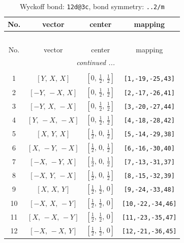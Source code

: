\documentclass[fleqn,8pt]{jsarticle}
\begin{document}
\begin{longtable}{cccc}
\caption{Wyckoff bond: {\tt 12d@3c}, bond symmetry: {\tt ..2/m}}
 \\
 \hline \hline
No. & vector & center & mapping \\ \hline \endfirsthead

\multicolumn{3}{l}{\tablename\ \thetable{}} \\
 \hline \hline
No. & vector & center & mapping \\ \hline \endhead

 \hline \hline
\multicolumn{3}{r}{\footnotesize\it continued ...} \\ \endfoot

 \hline \hline
\multicolumn{3}{r}{} \\ \endlastfoot

1 & $\left[ Y,\, X,\, X \right]$ & $\left[ 0,\, \frac{1}{2},\, \frac{1}{2} \right]$ & {\tt [1,-19,-25,43]} \\ \hline
2 & $\left[ - Y,\, - X,\, X \right]$ & $\left[ 0,\, \frac{1}{2},\, \frac{1}{2} \right]$ & {\tt [2,-17,-26,41]} \\ \hline
3 & $\left[ - Y,\, X,\, - X \right]$ & $\left[ 0,\, \frac{1}{2},\, \frac{1}{2} \right]$ & {\tt [3,-20,-27,44]} \\ \hline
4 & $\left[ Y,\, - X,\, - X \right]$ & $\left[ 0,\, \frac{1}{2},\, \frac{1}{2} \right]$ & {\tt [4,-18,-28,42]} \\ \hline
5 & $\left[ X,\, Y,\, X \right]$ & $\left[ \frac{1}{2},\, 0,\, \frac{1}{2} \right]$ & {\tt [5,-14,-29,38]} \\ \hline
6 & $\left[ X,\, - Y,\, - X \right]$ & $\left[ \frac{1}{2},\, 0,\, \frac{1}{2} \right]$ & {\tt [6,-16,-30,40]} \\ \hline
7 & $\left[ - X,\, - Y,\, X \right]$ & $\left[ \frac{1}{2},\, 0,\, \frac{1}{2} \right]$ & {\tt [7,-13,-31,37]} \\ \hline
8 & $\left[ - X,\, Y,\, - X \right]$ & $\left[ \frac{1}{2},\, 0,\, \frac{1}{2} \right]$ & {\tt [8,-15,-32,39]} \\ \hline
9 & $\left[ X,\, X,\, Y \right]$ & $\left[ \frac{1}{2},\, \frac{1}{2},\, 0 \right]$ & {\tt [9,-24,-33,48]} \\ \hline
10 & $\left[ - X,\, X,\, - Y \right]$ & $\left[ \frac{1}{2},\, \frac{1}{2},\, 0 \right]$ & {\tt [10,-22,-34,46]} \\ \hline
11 & $\left[ X,\, - X,\, - Y \right]$ & $\left[ \frac{1}{2},\, \frac{1}{2},\, 0 \right]$ & {\tt [11,-23,-35,47]} \\ \hline
12 & $\left[ - X,\, - X,\, Y \right]$ & $\left[ \frac{1}{2},\, \frac{1}{2},\, 0 \right]$ & {\tt [12,-21,-36,45]} \\
\end{longtable}
\end{document}
